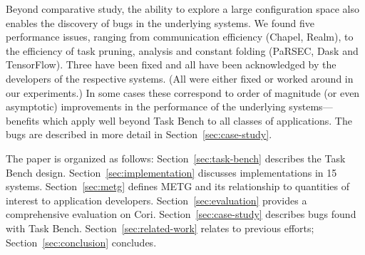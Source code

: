 

Beyond comparative study, the ability to explore a large configuration
space also enables the discovery of bugs in the underlying systems. We
found five performance issues, ranging from communication efficiency
(Chapel, Realm), to the efficiency of task pruning, analysis and
constant folding (PaRSEC, Dask and TensorFlow). Three have been fixed
and all have been acknowledged by the developers of the respective
systems. (All were either fixed or worked around in our experiments.)
In some cases these correspond to order of magnitude (or even
asymptotic) improvements in the performance of the underlying
systems---benefits which apply well beyond Task Bench to all classes
of applications. The bugs are described in more detail in Section~\ref{sec:case-study}.

The paper is organized as follows: Section~\ref{sec:task-bench}
describes the Task Bench design. Section~\ref{sec:implementation}
discusses implementations in 15 systems.  Section~\ref{sec:metg}
defines METG and its relationship to quantities of interest to
application developers.  Section~\ref{sec:evaluation} provides a
comprehensive evaluation on Cori. Section~\ref{sec:case-study} describes bugs found with Task Bench. Section~\ref{sec:related-work} relates to
previous efforts; Section~\ref{sec:conclusion} concludes.
